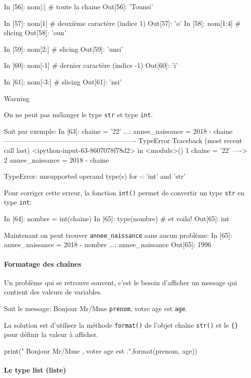 \documentclass[%
oneside,                 %
final,                   %
10pt]{article}
\begin{document}
In [56]: nom[:] # toute la chaine
Out[56]: 'Tounsi'

In [57]: nom[1] # deuxième caractère (indice 1)
Out[57]: 'o'
\eipy
\bipy
In [58]: nom[1:4]   # slicing
Out[58]: 'oun'

In [59]: nom[2:]  # slicing
Out[59]: 'unsi'

In [60]: nom[-1]   # dernier caractère (indice -1)
Out[60]: 'i'

In [61]: nom[-3:]    # slicing
Out[61]: 'nsi'

\eipy
\begin{block}{Warning}

On ne peut pas mélanger le type \texttt{str} et type \texttt{int}.

Soit par exemple:
\bipy
In [63]: chaine = '22'
    ...: annee_naissance = 2018 - chaine
----------------------------------------------------------
TypeError                  Traceback (most recent call last)
<ipython-input-63-8607078f78d2> in <module>()
      1 chaine = '22'
----> 2 annee_naissance = 2018 - chaine

TypeError: unsupported operand type(s) for -: 'int' and 'str'
\eipy
\end{block}
Pour corriger cette erreur, la fonction \texttt{int()} permet de convertir un type \texttt{str} en type \texttt{int}:

\bipy

In [64]: nombre = int(chaine)
In [65]: type(nombre) # et voila!
Out[65]: int
\eipy

Maintenant on peut trouver \Verb!annee_naissance! sans aucun problème:
\bipy
In [65]: annee_naissance = 2018 - nombre
    ...: annee_naissance
Out[65]: 1996
\eipy
\paragraph{ Formatage des chaînes}

Un problème qui se retrouve souvent, c’est le besoin d’afficher un message qui contient des valeurs de variables.

Soit le message: Bonjour Mr/Mme \texttt{prenom}, votre age est \texttt{age}.

La solution est d'utiliser la méthode \texttt{format()} de l'objet chaîne \texttt{str()} et le \Verb!{}! pour définir la valeur à afficher.

\bipy
print(" Bonjour Mr/Mme {}, votre age est {}.".format(prenom, age))
\eipy

\paragraph{Le type list (liste)}
\end{document}
